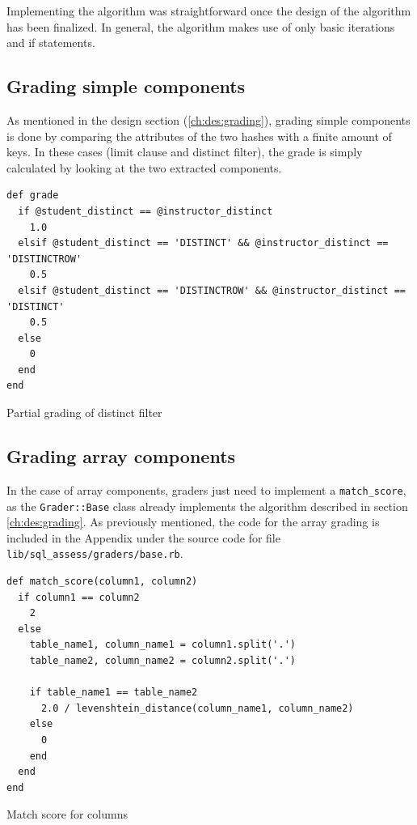 Implementing the algorithm was straightforward once the design of the algorithm has been finalized. In general, the algorithm makes use of only basic iterations and if statements.

\subsection{Grading simple components}
As mentioned in the design section (\ref{ch:des:grading}), grading simple components is done by comparing the attributes of the two hashes with a finite amount of keys. In these cases (limit clause and distinct filter), the grade is simply calculated by looking at the two extracted components.

\begin{code}
\begin{verbatim}
def grade
  if @student_distinct == @instructor_distinct
    1.0
  elsif @student_distinct == 'DISTINCT' && @instructor_distinct == 'DISTINCTROW'
    0.5
  elsif @student_distinct == 'DISTINCTROW' && @instructor_distinct == 'DISTINCT'
    0.5
  else
    0
  end
end
\end{verbatim}
\caption{Partial grading of distinct filter}
\end{code}

\subsection{Grading array components}

In the case of array components, graders just need to implement a \texttt{match_score}, as the \texttt{Grader::Base} class already implements the algorithm described in section \ref{ch:des:grading}. As previously mentioned, the code for the array grading is included in the Appendix under the source code for file \texttt{lib/sql\_assess/graders/base.rb}.

\begin{code}
\begin{verbatim}
def match_score(column1, column2)
  if column1 == column2
    2
  else
    table_name1, column_name1 = column1.split('.')
    table_name2, column_name2 = column2.split('.')

    if table_name1 == table_name2
      2.0 / levenshtein_distance(column_name1, column_name2)
    else
      0
    end
  end
end
\end{verbatim}

\caption{Match score for columns}
\end{code}

